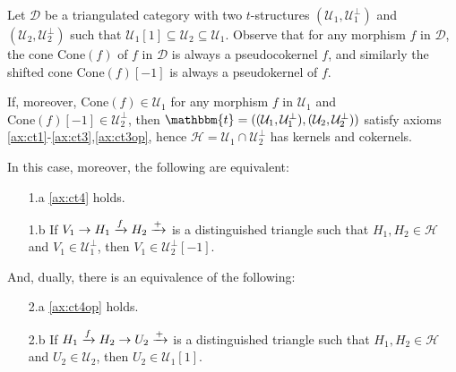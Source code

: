 \begin{example}\label{example_tria}
  Let $\mathcal{D}$ be a triangulated category with two $t$-structures
  $(\mathcal{U}_1,\mathcal{U}_1^\perp)$ and $(\mathcal{U}_2,\mathcal{U}_2^\perp)$ such that
  $\mathcal{U}_1[1]\subseteq\mathcal{U}_2\subseteq\mathcal{U}_1$. Observe that for any
  morphism $f$ in $\mathcal{D}$, the cone $\mathrm{Cone}(f)$ of $f$ in $\mathcal{D}$ is
  always a pseudocokernel $f$, and similarly the shifted cone $\mathrm{Cone}(f)[-1]$ is always
  a pseudokernel of $f$.

  If, moreover, $\mathrm{Cone}(f)\in\mathcal{U}_1$ for any morphism
  $f$ in $\mathcal{U}_1$ and $\mathrm{Cone}(f)[-1]\in\mathcal{U}_2^\perp$, then
  $\mathbbm{t}=((\mathcal{U}_1,\mathcal{U}_1^\perp),(\mathcal{U}_2,\mathcal{U}_2^\perp))$ satisfy
  axioms \ref{ax:ct1}-\ref{ax:ct3},\ref{ax:ct3op}, hence $\mathcal{H}=\mathcal{U}_1\cap\mathcal{U}_2^\perp$ has
  kernels and cokernels.

  In this case, moreover, the following are equivalent:
  \begin{enumerate}
    \item[1.a] \ref{ax:ct4} holds.
    \item[1.b]\label{ax:eqb} If $V_1\to H_1\xrightarrow{f} H_2\xrightarrow{+}$ is a distinguished triangle such
    that $H_1, H_2\in\mathcal{H}$ and $V_1\in\mathcal{U}_1^\perp$, then $V_1\in\mathcal{U}_2^\perp[-1]$.
  \end{enumerate}
  And, dually, there is an equivalence of the following:
  \begin{enumerate}
    \item[2.a] \ref{ax:ct4op} holds.
    \item[2.b]\label{ax:eqa} If $H_1\xrightarrow{f}H_2\to U_2\xrightarrow{+}$ is a distinguished triangle such
    that $H_1,H_2\in\mathcal{H}$ and $U_2\in\mathcal{U}_2$, then $U_2\in\mathcal{U}_1[1]$.
  \end{enumerate}
\end{example}

